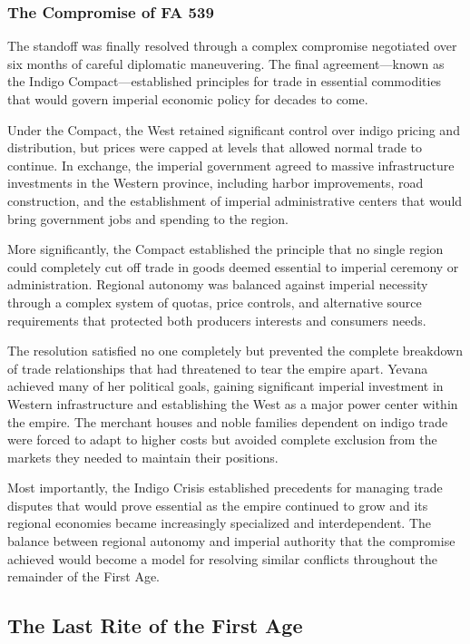 \subsubsection{The Compromise of FA 539}\label{the-compromise-of-fa-539}

The standoff was finally resolved through a complex compromise
negotiated over six months of careful diplomatic maneuvering. The final
agreement---known as the Indigo Compact---established principles for
trade in essential commodities that would govern imperial economic
policy for decades to come.

Under the Compact, the West retained significant control over indigo
pricing and distribution, but prices were capped at levels that allowed
normal trade to continue. In exchange, the imperial government agreed to
massive infrastructure investments in the Western province, including
harbor improvements, road construction, and the establishment of
imperial administrative centers that would bring government jobs and
spending to the region.

More significantly, the Compact established the principle that no single
region could completely cut off trade in goods deemed essential to
imperial ceremony or administration. Regional autonomy was balanced
against imperial necessity through a complex system of quotas, price
controls, and alternative source requirements that protected both
producers\textquotesingle{} interests and consumers\textquotesingle{}
needs.

The resolution satisfied no one completely but prevented the complete
breakdown of trade relationships that had threatened to tear the empire
apart. Yevana achieved many of her political goals, gaining significant
imperial investment in Western infrastructure and establishing the West
as a major power center within the empire. The merchant houses and noble
families dependent on indigo trade were forced to adapt to higher costs
but avoided complete exclusion from the markets they needed to maintain
their positions.

Most importantly, the Indigo Crisis established precedents for managing
trade disputes that would prove essential as the empire continued to
grow and its regional economies became increasingly specialized and
interdependent. The balance between regional autonomy and imperial
authority that the compromise achieved would become a model for
resolving similar conflicts throughout the remainder of the First Age.

\subsection{The Last Rite of the First
Age}\label{the-last-rite-of-the-first-age}

